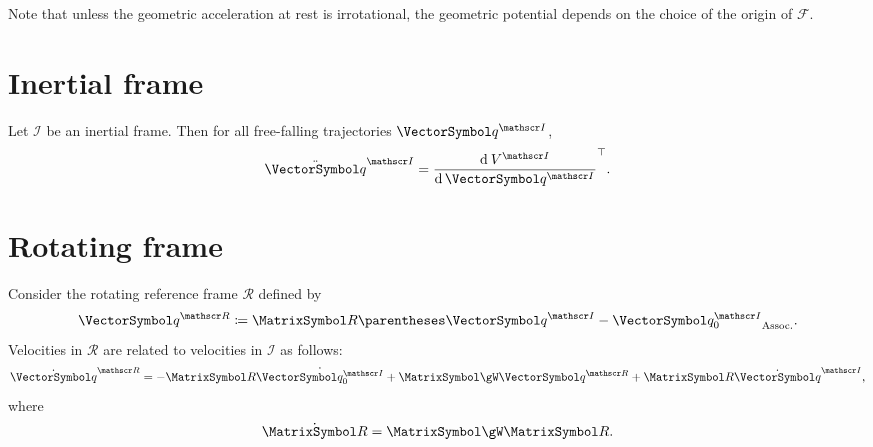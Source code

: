 \documentclass[10pt, a4paper, twoside]{basestyle}
\begin{document}
Note that unless the geometric acceleration at rest is irrotational, the geometric potential depends on
the choice of the origin of $\mathscr F$.

\section{Inertial frame}
Let $\mathscr I$ be an inertial frame. Then for all free-falling trajectories $\vq^{\mathscr I}$,
\begin{equation}
\SecondTimeDerivative\vq^{\mathscr I}=\Transpose{\deriv{\vq^{\mathscr I}}{V^{\mathscr I}}}\text.
\end{equation}
\section{Rotating frame}
Consider the rotating reference frame $\mathscr R$ defined by
\begin{equation}
\vq^{\mathscr R} \DefineAs \matR \pa{\vq^{\mathscr I} - \vq_0^{\mathscr I}}\text.
\end{equation}
Velocities in $\mathscr R$ are related to velocities in $\mathscr I$ as follows:
\begin{equation}
\TimeDerivative\vq^{\mathscr R} =  -  \matR \TimeDerivative{\vq_0^{\mathscr I}} + \MatrixSymbol\gW \vq^{\mathscr R} + \matR \TimeDerivative\vq^{\mathscr I}\text,
\end{equation}
where
\[
\TimeDerivative{\matR}=\MatrixSymbol\gW \matR\text.
\]
\end{document}
